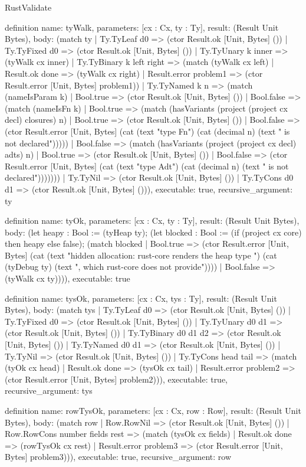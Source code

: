 \begin{lexlean}{RustValidate}
\begin{semanticmodule}
definition{
  name: tyWalk,
  parameters: [cx : Cx, ty : Ty],
  result: (Result Unit Bytes),
  body: (match ty
    | Ty.TyLeaf d0 => (ctor Result.ok [Unit, Bytes] ())
    | Ty.TyFixed d0 => (ctor Result.ok [Unit, Bytes] ())
    | Ty.TyUnary k inner => (tyWalk cx inner)
    | Ty.TyBinary k left right => (match (tyWalk cx left)
      | Result.ok done => (tyWalk cx right)
      | Result.error problem1 => (ctor Result.error [Unit, Bytes] problem1))
    | Ty.TyNamed k n => (match (nameIsParam k)
      | Bool.true => (ctor Result.ok [Unit, Bytes] ())
      | Bool.false => (match (nameIsFn k)
        | Bool.true => (match (hasVariants (project (project cx decl) closures) n)
          | Bool.true => (ctor Result.ok [Unit, Bytes] ())
          | Bool.false => (ctor Result.error [Unit, Bytes] (cat (text "type Fn") (cat (decimal n) (text " is not declared")))))
        | Bool.false => (match (hasVariants (project (project cx decl) adts) n)
          | Bool.true => (ctor Result.ok [Unit, Bytes] ())
          | Bool.false => (ctor Result.error [Unit, Bytes] (cat (text "type Adt") (cat (decimal n) (text " is not declared")))))))
    | Ty.TyNil => (ctor Result.ok [Unit, Bytes] ())
    | Ty.TyCons d0 d1 => (ctor Result.ok [Unit, Bytes] ())),
  executable: true,
  recursive_argument: ty
}

definition{
  name: tyOk,
  parameters: [cx : Cx, ty : Ty],
  result: (Result Unit Bytes),
  body: (let heapy : Bool := (tyHeap ty); (let blocked : Bool := (if (project cx core) then heapy else false); (match blocked
    | Bool.true => (ctor Result.error [Unit, Bytes] (cat (text "hidden allocation: rust-core renders the heap type ") (cat (tyDebug ty) (text ", which rust-core does not provide"))))
    | Bool.false => (tyWalk cx ty)))),
  executable: true
}

definition{
  name: tysOk,
  parameters: [cx : Cx, tys : Ty],
  result: (Result Unit Bytes),
  body: (match tys
    | Ty.TyLeaf d0 => (ctor Result.ok [Unit, Bytes] ())
    | Ty.TyFixed d0 => (ctor Result.ok [Unit, Bytes] ())
    | Ty.TyUnary d0 d1 => (ctor Result.ok [Unit, Bytes] ())
    | Ty.TyBinary d0 d1 d2 => (ctor Result.ok [Unit, Bytes] ())
    | Ty.TyNamed d0 d1 => (ctor Result.ok [Unit, Bytes] ())
    | Ty.TyNil => (ctor Result.ok [Unit, Bytes] ())
    | Ty.TyCons head tail => (match (tyOk cx head)
      | Result.ok done => (tysOk cx tail)
      | Result.error problem2 => (ctor Result.error [Unit, Bytes] problem2))),
  executable: true,
  recursive_argument: tys
}

definition{
  name: rowTysOk,
  parameters: [cx : Cx, row : Row],
  result: (Result Unit Bytes),
  body: (match row
    | Row.RowNil => (ctor Result.ok [Unit, Bytes] ())
    | Row.RowCons number fields rest => (match (tysOk cx fields)
      | Result.ok done => (rowTysOk cx rest)
      | Result.error problem3 => (ctor Result.error [Unit, Bytes] problem3))),
  executable: true,
  recursive_argument: row
}


\end{semanticmodule}
\end{lexlean}
